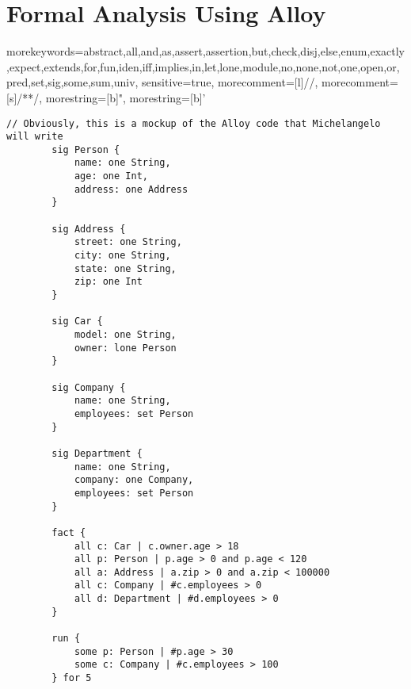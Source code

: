\chapter{Formal Analysis Using Alloy}
{
    morekeywords={abstract,all,and,as,assert,assertion,but,check,disj,else,enum,exactly,expect,extends,for,fun,iden,iff,implies,in,let,lone,module,no,none,not,one,open,or,pred,set,sig,some,sum,univ},
    sensitive=true,
    morecomment=[l]{//},
    morecomment=[s]{/*}{*/},
    morestring=[b]",
    morestring=[b]'
}
\begin{lstlisting}[language=Alloy,  label={lst:alloycode}, basicstyle=\fontfamily{Roboto}\selectfont\ttfamily]
        // Obviously, this is a mockup of the Alloy code that Michelangelo will write
        sig Person {
            name: one String,
            age: one Int,
            address: one Address
        }

        sig Address {
            street: one String,
            city: one String,
            state: one String,
            zip: one Int
        }

        sig Car {
            model: one String,
            owner: lone Person
        }

        sig Company {
            name: one String,
            employees: set Person
        }

        sig Department {
            name: one String,
            company: one Company,
            employees: set Person
        }

        fact {
            all c: Car | c.owner.age > 18
            all p: Person | p.age > 0 and p.age < 120
            all a: Address | a.zip > 0 and a.zip < 100000
            all c: Company | #c.employees > 0
            all d: Department | #d.employees > 0
        }

        run {
            some p: Person | #p.age > 30
            some c: Company | #c.employees > 100
        } for 5
            
        \end{lstlisting}
